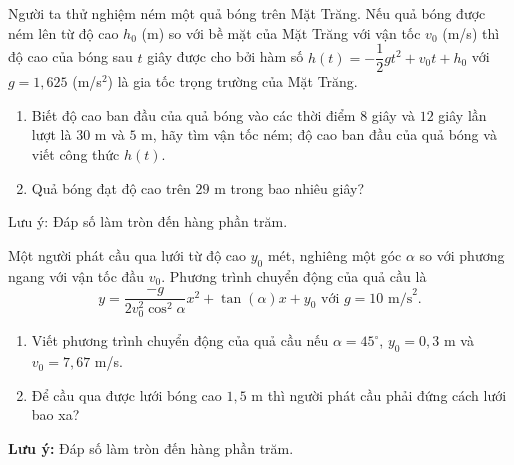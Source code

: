 \begin{bt}%
	Người ta thử nghiệm ném một quả bóng trên Mặt Trăng. Nếu quả bóng được ném lên từ độ cao $h_0$ (m) so với bề mặt của Mặt Trăng với vận tốc $v_0$ (m/s) thì độ cao của bóng sau $t$ giây được cho bởi hàm số $h(t)=-\dfrac{1}{2}gt^2+v_0t+h_0$ với $g=1{,}625$ (m/s$^2$) là gia tốc trọng trường của Mặt Trăng.
	\begin{enumerate}
		\item Biết độ cao ban đầu của quả bóng vào các thời điểm $8$ giây và $12$ giây lần lượt là $30$ m và $5$ m, hãy tìm vận tốc ném; độ cao ban đầu của quả bóng và viết công thức $h(t)$.
		\item Quả bóng đạt độ cao trên $29$ m trong bao nhiêu giây?
	\end{enumerate}
	Lưu ý: Đáp số làm tròn đến hàng phần trăm.
\end{bt}

\begin{bt}%
	Một người phát cầu qua lưới từ độ cao $y_0$ mét, nghiêng một góc $\alpha$ so với phương ngang với vận tốc đầu $v_0$.
	Phương trình chuyển động của quả cầu là
	\[y=\dfrac{-g}{2v_0^2\cos^2\alpha}x^2+\tan (\alpha)x+y_0 \text{ với } g=10 \text{ m/s}^2.\]
	\begin{enumerate}
		\item Viết phương trình chuyển động của quả cầu nếu $\alpha =45^{\circ}$, $y_0=0{,}3$ m và $v_0=7{,}67$ m/s.
		\item Để cầu qua được lưới bóng cao $1{,}5$ m thì người phát cầu phải đứng cách lưới bao xa?
	\end{enumerate}
	\textbf{Lưu ý:} Đáp số làm tròn đến hàng phần trăm.
\end{bt}

